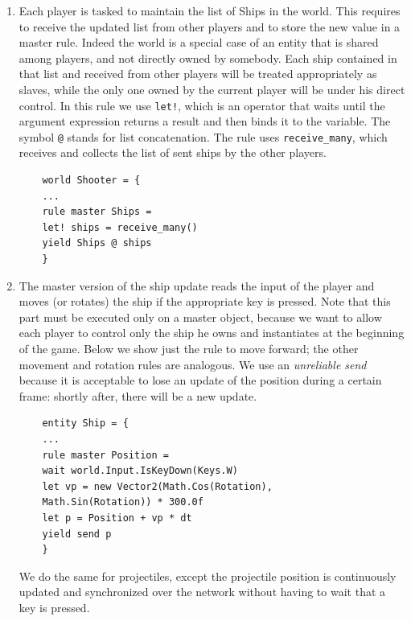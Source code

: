 \begin{enumerate}
	\item Each player is tasked to maintain the list of Ships in the world. This requires to receive the updated list from other players and to store the new value in a master rule. Indeed the world is a special case of an entity that is shared among players, and not directly owned by somebody. Each ship contained in that list and received from other players will be treated appropriately as slaves, while the only one owned by the current player will be under his direct control. In this rule we use \texttt{let!}, which is an operator that waits until the argument expression returns a result and then binds it to the variable. The symbol \texttt{@} stands for list concatenation. The rule uses \texttt{receive\_many}, which receives and collects the list of sent ships by the other players.
	
	\begin{lstlisting}
	world Shooter = {
	...
	rule master Ships =
	let! ships = receive_many()
	yield Ships @ ships
	}
	\end{lstlisting}
	
	\item The master version of the ship update reads the input of the player and moves (or rotates) the ship if the appropriate key is pressed. Note that this part must be executed only on a master object, because we want to allow each player to control only the ship he owns and instantiates at the beginning of the game. Below we show just the rule to move forward; the other movement and rotation rules are analogous. We use an \textit{unreliable send} because it is acceptable to lose an update of the position during a certain frame: shortly after, there will be a new update.
	
	\begin{lstlisting}
	entity Ship = {
	...
	rule master Position =
	wait world.Input.IsKeyDown(Keys.W)
	let vp = new Vector2(Math.Cos(Rotation), 
	Math.Sin(Rotation)) * 300.0f
	let p = Position + vp * dt
	yield send p
	}
	\end{lstlisting}
	
	We do the same for projectiles, except the projectile position is continuously updated and synchronized over the network without having to wait that a key is pressed.
	

\end{enumerate}
